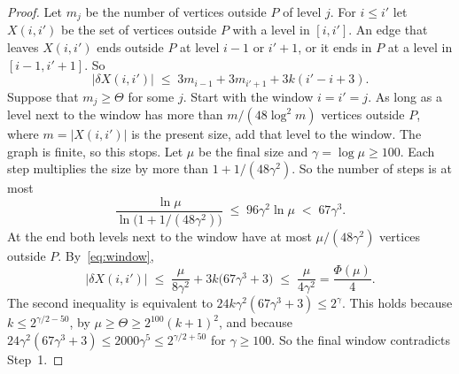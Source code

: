\begin{proof}
 Let $m_j$ be the number of vertices outside $P$ of level $j$.
For $i\le i'$ let $X(i,i')$ be the set of vertices outside $P$ with a level in $[i,i']$. An edge
that leaves $X(i,i')$ ends outside $P$ at level $i-1$ or $i'+1$, or it ends in $P$ at a level in
$[i-1,i'+1]$. So
\begin{equation}\label{eq:window}
  |\delta X(i,i')|\;\le\;3m_{i-1}+3m_{i'+1}+3k(i'-i+3).
\end{equation}
Suppose that $m_j\ge\Theta$ for some $j$. Start with the window $i=i'=j$. As long as a level next
to the window has more than $m/(48\log^{2}m)$ vertices outside $P$, where $m=|X(i,i')|$ is the
present size, add that level to the window. The graph is finite, so this stops. Let $\mu$ be the
final size and $\gamma=\log\mu\ge100$. Each step multiplies the size by more than
$1+1/(48\gamma^{2})$. So the number of steps is at most
\[
  \frac{\ln\mu}{\ln\bigl(1+1/(48\gamma^{2})\bigr)}\;\le\;96\gamma^{2}\ln\mu\;<\;67\gamma^{3}.
\]
At the end both levels next to the window have at most $\mu/(48\gamma^{2})$ vertices outside $P$.
By~\eqref{eq:window},
\[
  |\delta X(i,i')|\;\le\;\frac{\mu}{8\gamma^{2}}+3k\bigl(67\gamma^{3}+3\bigr)
  \;\le\;\frac{\mu}{4\gamma^{2}}=\frac{\Phi(\mu)}4 .
\]
The second inequality is equivalent to $24k\gamma^{2}(67\gamma^{3}+3)\le2^{\gamma}$. This holds because
$k\le2^{\gamma/2-50}$, by $\mu\ge\Theta\ge2^{100}(k+1)^{2}$, and because
$24\gamma^{2}(67\gamma^{3}+3)\le2000\gamma^{5}\le2^{\gamma/2+50}$ for $\gamma\ge100$. So the final
window contradicts Step~1.
\end{proof}

